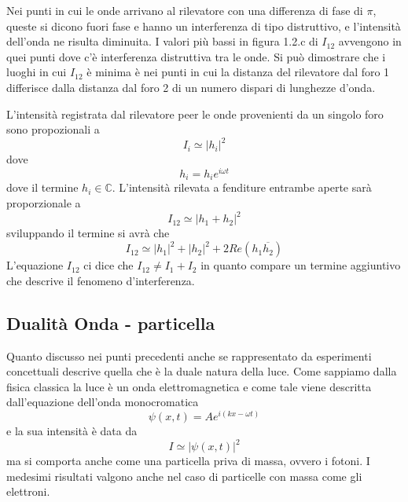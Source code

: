 Nei punti in cui le onde arrivano al rilevatore con una differenza di fase di $\pi$, queste si dicono fuori fase e hanno un interferenza di tipo distruttivo, e l'intensit\`a dell'onda ne risulta diminuita. I valori pi\`u bassi in figura 1.2.c di $I_{12}$ avvengono in quei punti dove c'\`e interferenza distruttiva tra le onde. Si pu\`o dimostrare che i luoghi in cui $I_{12}$ \`e minima \`e nei punti in cui la distanza del rilevatore dal foro 1 differisce dalla distanza dal foro 2 di un numero dispari di lunghezze d'onda.

\noindent L'intensit\`a registrata dal rilevatore peer le onde provenienti da un singolo foro sono propozionali a
\begin{equation}
	I_i \simeq |h_i|^2 
\end{equation}
dove 
\begin{equation}
	h_i = h_ie^{i\omega t} 
\end{equation}
dove il termine $h_i \in \mathbb{C}$. L'intensit\`a rilevata a fenditure entrambe aperte sar\`a proporzionale a 
\begin{equation}
	I_{12} \simeq |h_1 + h_2|^2
\end{equation} 
sviluppando il termine si avr\`a che
\begin{equation}
	I_{12} \simeq |h_1|^2 + |h_2|^2 + 2Re(h_1\overline{h_2})
\end{equation}
L'equazione $I_{12}$ ci dice che $I_{12} \neq I_1 + I_2$ in quanto compare un termine aggiuntivo che descrive il fenomeno d'interferenza.

\subsection{Dualit\`a Onda - particella}

Quanto discusso nei punti precedenti anche se rappresentato da esperimenti concettuali descrive quella che \`e la duale natura della luce. Come sappiamo dalla fisica classica la luce \`e un onda elettromagnetica e come tale viene descritta dall'equazione dell'onda monocromatica
\begin{equation}
	\psi(x,t) = A e^{i(kx - \omega t)}
\end{equation}
e la sua intensit\`a \`e data da 
\begin{equation}
	I \simeq |\psi(x,t)|^2
\end{equation}
ma si comporta anche come una particella priva di massa, ovvero i fotoni. I medesimi risultati valgono anche nel caso di particelle con massa come gli elettroni. 


